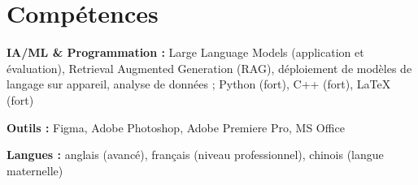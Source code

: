 \section{Compétences}

        \begin{onecolentry}
            \textbf{IA/ML \& Programmation :} Large Language Models (application et évaluation), Retrieval Augmented Generation (RAG), déploiement de modèles de langage sur appareil, analyse de données ; Python (fort), C++ (fort), LaTeX (fort)
        \end{onecolentry}
        \vspace{0.1 cm}

        \begin{onecolentry}
            \textbf{Outils :} Figma, Adobe Photoshop, Adobe Premiere Pro, MS Office
        \end{onecolentry}
        \vspace{0.1 cm}

        \begin{onecolentry}
            \textbf{Langues :} anglais (avancé), français (niveau professionnel), chinois (langue maternelle)
        \end{onecolentry}
